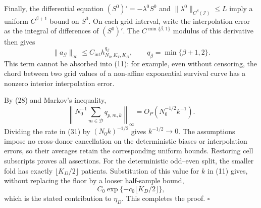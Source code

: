 Finally, the differential equation \((S^0)'=-\lambda^0S^0\) and \(\|\lambda^0\|_{C^\beta(\mathcal I)}\le L\) imply a uniform \(C^{\beta+1}\) bound on \(S^0\).  On each grid interval, write the interpolation error as the integral of differences of \((S^0)'\).  The \(C^{\min\{\beta,1\}}\) modulus of this derivative then gives
\[
 \|a_{\mathcal G}\|_\infty
 \le C_{\mathrm{int}}h_{N_0,K_T,K_D}^{q_\beta},
 \qquad q_\beta=\min\{\beta+1,2\}.                         \tag{30}
\]
This term cannot be absorbed into (11): for example, even without censoring, the chord between two grid values of a non-affine exponential survival curve has a nonzero interior interpolation error.

By (28) and Markov's inequality,
\[
 \left\|N_0^{-1}\sum_{m\in\mathcal D}q_{p,m,k}\right\|_\infty
 =O_P(N_0^{-1/2}k^{-1}).                                    \tag{31}
\]
Dividing the rate in (31) by \((N_0k)^{-1/2}\) gives \(k^{-1/2}\to0\).  The assumptions impose no cross-donor cancellation on the deterministic biases or interpolation errors, so their averages retain the corresponding uniform bounds.  Restoring cell subscripts proves all assertions.  For the deterministic odd--even split, the smaller fold has exactly \(\lfloor K_D/2\rfloor\) patients.  Substitution of this value for \(k\) in (11) gives, without replacing the floor by a looser half-sample bound,
\[
 C_0\exp\{-c_0\lfloor K_D/2\rfloor\},
\]
which is the stated contribution to \(\eta_D\).  This completes the proof. \(\square\)